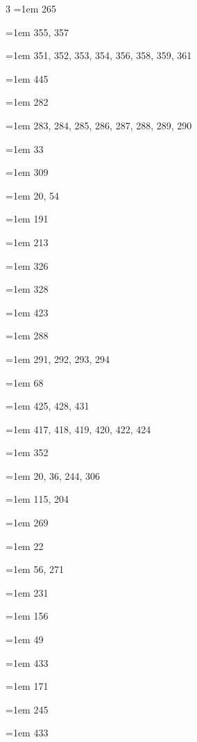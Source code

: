\begin{multicols}{3}
\hangindent=1em  265\par
\hangindent=1em  355, 357\par
\hangindent=1em  351, 352, 353, 354, 356, 358, 359, 361\par
\hangindent=1em  445\par
\hangindent=1em  282\par
\hangindent=1em  283, 284, 285, 286, 287, 288, 289, 290\par
\hangindent=1em  33\par
\hangindent=1em  309\par
\hangindent=1em  20, 54\par
\hangindent=1em  191\par
\hangindent=1em  213\par
\hangindent=1em  326\par
\hangindent=1em  328\par
\hangindent=1em  423\par
\hangindent=1em  288\par
\hangindent=1em  291, 292, 293, 294\par
\hangindent=1em  68\par
\hangindent=1em  425, 428, 431\par
\hangindent=1em  417, 418, 419, 420, 422, 424\par
\hangindent=1em  352\par
\hangindent=1em  20, 36, 244, 306\par
\hangindent=1em  115, 204\par
\hangindent=1em  269\par
\hangindent=1em  22\par
\hangindent=1em  56, 271\par
\hangindent=1em  231\par
\hangindent=1em  156\par
\hangindent=1em  49\par
\hangindent=1em  433\par
\hangindent=1em  171\par
\hangindent=1em  245\par
\hangindent=1em  433\par

\end{multicols}
